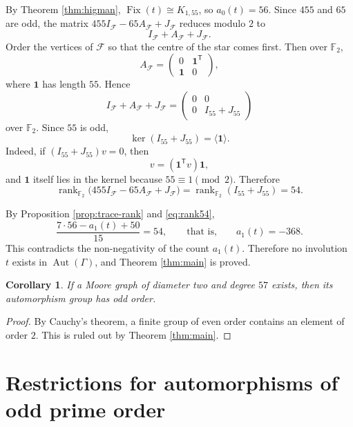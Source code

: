 \documentclass[11pt]{article}
\theoremstyle{plain}
\newtheorem{corollary}[theorem]{Corollary}
\theoremstyle{remark}
\newcommand{\Aut}{\operatorname{Aut}}
\newcommand{\Fix}{\operatorname{Fix}}
\newcommand{\rank}{\operatorname{rank}}
\newcommand{\Ftwo}{\mathbb F_2}
\newcommand{\one}{\mathbf 1}
\begin{document}
By Theorem \ref{thm:higman}, $\Fix(t)\cong K_{1,55}$, so $a_0(t)=56$.
Since $455$ and $65$ are odd, the matrix $455I_{\mathcal F}-65A_{\mathcal F}+J_{\mathcal F}$ reduces modulo $2$ to
\[
 I_{\mathcal F}+A_{\mathcal F}+J_{\mathcal F}.
\]
Order the vertices of $\mathcal F$ so that the centre of the star comes first.  Then over $\Ftwo$,
\[
 A_{\mathcal F}=
 \begin{pmatrix}
 0&\one^{\mathsf T}\\
 \one&0
 \end{pmatrix},
\]
where $\one$ has length $55$.  Hence
\begin{equation}\label{eq:block}
 I_{\mathcal F}+A_{\mathcal F}+J_{\mathcal F}=
 \begin{pmatrix}
 0&0\\
 0&I_{55}+J_{55}
 \end{pmatrix}
\end{equation}
over $\Ftwo$.  Since $55$ is odd,
\[
 \ker(I_{55}+J_{55})=\langle \one\rangle.
\]
Indeed, if $(I_{55}+J_{55})v=0$, then
\[
 v=(\one^{\mathsf T}v)\one,
\]
and $\one$ itself lies in the kernel because $55\equiv 1\pmod 2$.  Therefore
\begin{equation}\label{eq:rank54}
 \rank_{\Ftwo}\bigl(455I_{\mathcal F}-65A_{\mathcal F}+J_{\mathcal F}\bigr)
 =\rank_{\Ftwo}(I_{55}+J_{55})=54.
\end{equation}

By Proposition \ref{prop:trace-rank} and \eqref{eq:rank54},
\[
 \frac{7\cdot 56-a_1(t)+50}{15}=54,
 \qquad\text{that is,}\qquad
 a_1(t)=-368.
\]
This contradicts the non-negativity of the count $a_1(t)$.
Therefore no involution $t$ exists in $\Aut(\Gamma)$, and Theorem \ref{thm:main} is proved.

\begin{corollary}\label{cor:odd-order}
If a Moore graph of diameter two and degree $57$ exists, then its automorphism group has odd order.
\end{corollary}

\begin{proof}
By Cauchy's theorem, a finite group of even order contains an element of order $2$.
This is ruled out by Theorem \ref{thm:main}.
\end{proof}

\section{Restrictions for automorphisms of odd prime order}\label{sec:odd}
\end{document}
